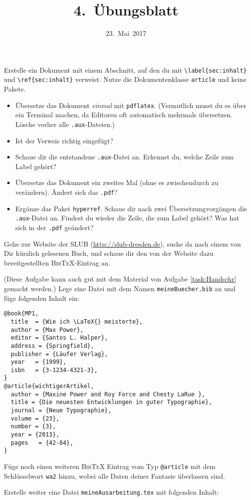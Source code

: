 \documentclass{latex-htw-uebung}
\title{4.~Übungsblatt}
\date{23.~Mai~2017}
\begin{document}
\NewTask Erstelle ein Dokument mit einem Abschnitt, auf den du mit \lstinline|\label{sec:inhalt}| und \lstinline|\ref{sec:inhalt}| verweist. Nutze die Dokumentenklasse \lstinline{article} und keine Pakete.
\begin{itemize}
  \item Übersetze das Dokument \emph{einmal} mit \lstinline|pdflatex|. (Vermutlich musst du es über ein Terminal machen, da Editoren oft automatisch mehrmals übersetzen. Lösche vorher alle \lstinline|.aux|-Dateien.)
  \item Ist der Verweis richtig eingefügt?
  \item Schaue dir die entstandene \lstinline|.aux|-Datei an. Erkennst du, welche Zeile zum Label gehört?
  \item Übersetze das Dokument ein zweites Mal (ohne es zwischendurch zu verändern). Ändert sich das \lstinline|.pdf|?
  \item Ergänze das Paket \lstinline|hyperref|. Schaue dir nach zwei Übersetzungvorgängen die \lstinline|.aux|-Datei an. Findest du wieder die Zeile, die zum Label gehört? Was hat sich in der \lstinline|.pdf| geändert?
\end{itemize} 
\NewTask Gehe zur Website der SLUB (\url{http://slub-dresden.de}), suche da nach
einem von Dir kürzlich gelesenen Buch, und schaue dir den von der Website dazu
bereitgestellten \textsc{Bib\TeX}-Eintrag an.

\NewTask (Diese Aufgabe kann auch gut mit dem Material von Aufgabe \ref{task:Handschr} gemacht werden.) Lege eine Datei mit dem Namen \texttt{meineBuecher.bib} an und füge
folgenden Inhalt ein:

\begin{lstlisting}
@book{MP1,
  title  = {Wie ich \LaTeX{} meisterte},
  author = {Max Power},
  editor = {Santos L. Halper},
  address = {Springfield},
  publisher = {Läufer Verlag},
  year   = {1999},
  isbn   = {3-1234-4321-3},
}
@article{wichtigerArtikel,
  author = {Maxine Power and Roy Force and Chesty LaRue },
  title = {Die neuesten Entwicklungen in guter Typographie},
  journal = {Neue Typographie},
  volume = {23},
  number = {3},
  year = {2013},
  pages   = {42-84},
}
\end{lstlisting}
Füge noch einen weiteren \textsc{Bib\TeX} Eintrag vom Typ
\lstinline|@article| mit dem Schlüsselwort \lstinline|wa2| hinzu, wobei
alle Daten deiner Fantasie überlassen sind.


Erstelle weiter eine Datei \texttt{meineAusarbeitung.tex} mit
folgenden Inhalt:
\end{document}
